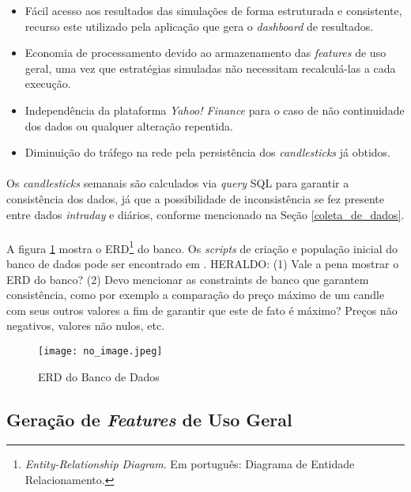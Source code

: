 \begin{itemize}
    \item Fácil acesso aos resultados das simulações de forma estruturada e consistente, recurso este utilizado pela aplicação que gera o \textit{dashboard} de resultados.
    \item Economia de processamento devido ao armazenamento das \textit{features} de uso geral, uma vez que estratégias simuladas não necessitam recalculá-las a cada execução.
    \item Independência da plataforma \textit{Yahoo! Finance} para o caso de não continuidade dos dados ou qualquer alteração repentida.
    \item Diminuição do tráfego na rede pela persistência dos \textit{candlesticks} já obtidos.
\end{itemize}

\paragraph{} Os \textit{candlesticks} semanais são calculados via \textit{query} SQL para garantir a consistência dos dados, já que a possibilidade de inconsistência se fez presente entre dados \textit{intraday} e diários, conforme mencionado na Seção \ref{coleta_de_dados}.

\paragraph{} A figura \ref{fig:103} mostra o ERD\footnote{\textit{Entity-Relationship Diagram}. Em português: Diagrama de Entidade Relacionamento.} do banco. Os \textit{scripts} de criação e população inicial do banco de dados pode ser encontrado em \cite{github_projeto}. \color{red} HERALDO: (1) Vale a pena mostrar o ERD do banco? (2) Devo mencionar as constraints de banco que garantem consistência, como por exemplo a comparação do preço máximo de um candle com seus outros valores a fim de garantir que este de fato é máximo? Preços não negativos, valores não nulos, etc. 

\begin{figure}[h]
    \texttt{[image: no\_image.jpeg]}
    \centering
    \caption{ERD do Banco de Dados}
    \label{fig:103}
\end{figure}



\subsection{Geração de \textit{Features} de Uso Geral}

